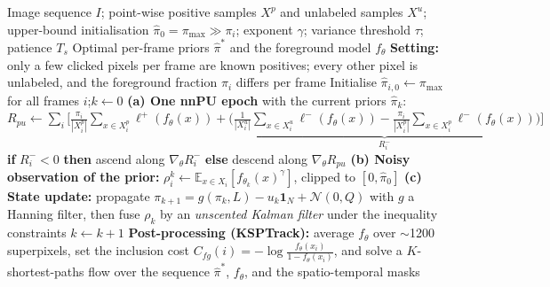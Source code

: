 \documentclass{article}
\begin{document}
\begin{algorithm}[!h]
\renewcommand{\algorithmicrequire}{\textbf{Input:}}
\renewcommand{\algorithmicensure}{\textbf{Output:}}
	\caption{SSnnPU: self-supervised nnPU with per-frame class-prior estimation}
	\begin{algorithmic}[1]
	    \REQUIRE
	    Image sequence $I$; point-wise positive samples $X^{p}$ and unlabeled samples $X^{u}$;
	    upper-bound initialisation $\hat{\pi}_{0}=\pi_{\max}\gg\pi_{i}$;
	    exponent $\gamma$; variance threshold $\tau$; patience $T_{s}$
	    \ENSURE
	    Optimal per-frame priors $\hat{\pi}^{\ast}$ and the foreground model $f_{\theta}$
	    \STATE \textbf{Setting:} only a few clicked pixels per frame are known positives;
	    every other pixel is unlabeled, and the foreground fraction $\pi_{i}$ differs per frame %
	    \STATE Initialise $\hat{\pi}_{i,0}\leftarrow \pi_{\max}$ for all frames $i$;\quad $k\leftarrow 0$
	    \REPEAT
	    \STATE \textbf{(a) One nnPU epoch} with the current priors $\hat{\pi}_{k}$:
	    \STATE $R_{pu}\leftarrow \sum_{i}\Big[\frac{\pi_{i}}{|X_{i}^{p}|}\sum_{x\in X_{i}^{p}}\ell^{+}(f_{\theta}(x))
	    +\underbrace{\big(\tfrac{1}{|X_{i}^{u}|}\sum_{x\in X_{i}^{u}}\ell^{-}(f_{\theta}(x))
	    -\tfrac{\pi_{i}}{|X_{i}^{p}|}\sum_{x\in X_{i}^{p}}\ell^{-}(f_{\theta}(x))\big)}_{R_{i}^{-}}\Big]$
	    \STATE \textbf{if} $R_{i}^{-}<0$ \textbf{then} ascend along $\nabla_{\theta}R_{i}^{-}$
	    \textbf{else} descend along $\nabla_{\theta}R_{pu}$ %
	    \ENDFOR
	    \STATE \textbf{(b) Noisy observation of the prior:}
	    $\rho_{i}^{k}\leftarrow \mathbb{E}_{x\in X_{i}}\!\left[f_{\theta_{k}}(x)^{\gamma}\right]$,
	    clipped to $[0,\hat{\pi}_{0}]$ %
	    \STATE \textbf{(c) State update:} propagate
	    $\pi_{k+1}=g(\pi_{k},L)-u_{k}\mathbf{1}_{N}+\mathcal{N}(0,Q)$ with $g$ a Hanning filter,
	    then fuse $\rho_{k}$ by an \emph{unscented Kalman filter} under the inequality constraints %
	    \STATE $k\leftarrow k+1$
	    \STATE \textbf{Post-processing (KSPTrack):} average $f_{\theta}$ over $\sim$1200 superpixels,
	    set the inclusion cost $C_{fg}(i)=-\log\frac{f_{\theta}(x_{i})}{1-f_{\theta}(x_{i})}$,
	    and solve a $K$-shortest-paths flow over the sequence %
		\RETURN $\hat{\pi}^{\ast}$, $f_{\theta}$, and the spatio-temporal masks
	\end{algorithmic}
\end{algorithm}
\end{document}
